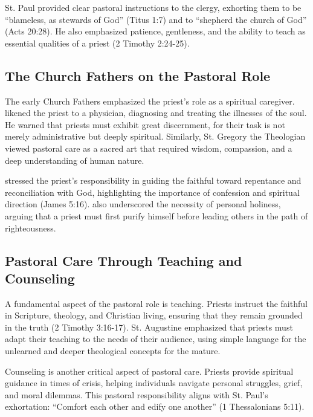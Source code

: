 \documentclass[12pt,doc]{apa7}   	%
\begin{document}
St. Paul provided clear pastoral instructions to the clergy, exhorting them to be ``blameless, as stewards of God'' (Titus 1:7) and to ``shepherd the church of God'' (Acts 20:28). He also emphasized patience, gentleness, and the ability to teach as essential qualities of a priest (2 Timothy 2:24-25).

\subsection{The Church Fathers on the Pastoral Role}

The early Church Fathers emphasized the priest’s role as a spiritual caregiver. \citet{priesthood_chrysostom,complete_work_chrysostom} likened the priest to a physician, diagnosing and treating the illnesses of the soul. He warned that priests must exhibit great discernment, for their task is not merely administrative but deeply spiritual. Similarly, St. Gregory the Theologian \citep{early_church_akin} viewed pastoral care as a sacred art that required wisdom, compassion, and a deep understanding of human nature.

\citet{priesthood_shenouda} stressed the priest’s responsibility in guiding the faithful toward repentance and reconciliation with God, highlighting the importance of confession and spiritual direction (James 5:16). \citet{st_basil_letters} also underscored the necessity of personal holiness, arguing that a priest must first purify himself before leading others in the path of righteousness.

\subsection{Pastoral Care Through Teaching and Counseling}

A fundamental aspect of the pastoral role is teaching. Priests instruct the faithful in Scripture, theology, and Christian living, ensuring that they remain grounded in the truth (2 Timothy 3:16-17). St. Augustine \citep{early_church_akin} emphasized that priests must adapt their teaching to the needs of their audience, using simple language for the unlearned and deeper theological concepts for the mature.

Counseling is another critical aspect of pastoral care. Priests provide spiritual guidance in times of crisis, helping individuals navigate personal struggles, grief, and moral dilemmas. This pastoral responsibility aligns with St. Paul’s exhortation: ``Comfort each other and edify one another'' (1 Thessalonians 5:11).
\end{document}
